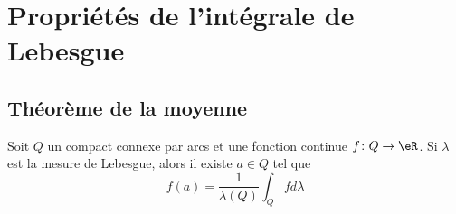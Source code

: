 
\section{Propriétés de l'intégrale de Lebesgue}

\subsection{Théorème de la moyenne}

\begin{theorem}      \label{ThoooEZLGooMChwLT}
    Soit \( Q\) un compact connexe par arcs et une fonction continue \( f\colon Q\to \eR\). Si \( \lambda\) est la mesure de Lebesgue, alors il existe \( a\in Q\) tel que
    \begin{equation}
        f(a)=\frac{1}{ \lambda(Q) }\int_Qfd\lambda
    \end{equation}
\end{theorem}

